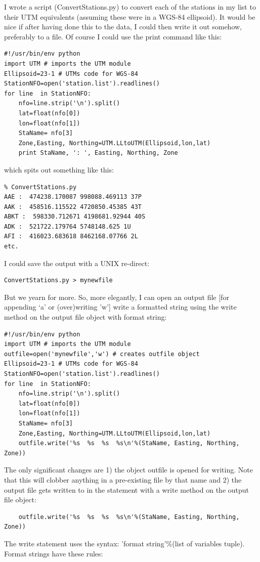 \documentclass[11pt]{book}
\begin{document}
{{{\noindent I wrote a script ({\color{blue}ConvertStations.py}) to convert each of the stations in my list to their UTM equivalents (assuming these were in a WGS-84 ellipsoid).  It would be nice if  after having done this to the data, I could then write it out somehow, preferably to a file.  Of course I could use the {\color{blue}print} command like this:


 { \color{blue} \begin{verbatim}
#!/usr/bin/env python
import UTM # imports the UTM module
Ellipsoid=23-1 # UTMs code for WGS-84
StationNFO=open('station.list').readlines()
for line  in StationNFO:
    nfo=line.strip('\n').split()
    lat=float(nfo[0])
    lon=float(nfo[1])
    StaName= nfo[3]
    Zone,Easting, Northing=UTM.LLtoUTM(Ellipsoid,lon,lat)
    print StaName, ': ', Easting, Northing, Zone
 \end{verbatim}}

\noindent
which spits out something like this: 

{ \color{blue} \begin{verbatim}
% ConvertStations.py
AAE :  474238.170087 998088.469113 37P
AAK :  458516.115522 4720850.45385 43T
ABKT :  598330.712671 4198681.92944 40S
ADK :  521722.179764 5748148.625 1U
AFI :  416023.683618 8462168.07766 2L
etc.
\end{verbatim}}

\noindent 
I could save the output with a UNIX re-direct: 
 { \color{blue} \begin{verbatim}
ConvertStations.py > mynewfile
 \end{verbatim}}
 
But we yearn for more.  So,  more  elegantly, I can open an output file [for appending `a' or (over)writing 'w']  write a formatted string using the write method on  the output file object with format string:

 { \color{blue} \begin{verbatim}
#!/usr/bin/env python
import UTM # imports the UTM module
outfile=open('mynewfile','w') # creates outfile object
Ellipsoid=23-1 # UTMs code for WGS-84
StationNFO=open('station.list').readlines()
for line  in StationNFO:
    nfo=line.strip('\n').split()
    lat=float(nfo[0])
    lon=float(nfo[1])
    StaName= nfo[3]
    Zone,Easting, Northing=UTM.LLtoUTM(Ellipsoid,lon,lat)
    outfile.write('%s  %s  %s  %s\n'%(StaName, Easting, Northing, Zone))
\end{verbatim}}

\noindent
The only significant changes are 1) the object {\color{blue}outfile} is opened for writing. Note that this will clobber anything in a pre-existing file by that name and 2) the output file gets written to in the statement with a write method on the output file object:
{ \color{blue} \begin{verbatim}
    outfile.write('%s  %s  %s  %s\n'%(StaName, Easting, Northing, Zone))
\end{verbatim}}
\noindent
The write statement uses the syntax:  'format string'\%(list of variables tuple).  Format strings have these rules:

}}}
\end{document}
